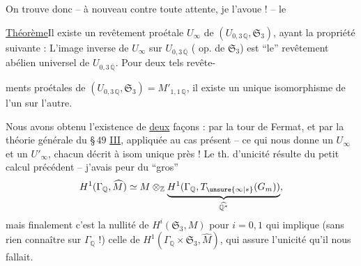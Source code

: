 On trouve donc -- à nouveau contre toute attente, je l'avoue ! -- le

\uline{Théorème}\quad Il existe un revêtement
proétale  $U_\infty$ de $(U_{0,3\,\mathbb Q},\mathfrak S_3)$, ayant la propriété suivante : L'image inverse  de $U_\infty$ sur $U_{0,3\,\overline{\mathbb Q}}$ ( op. de $\mathfrak S_3$) est ``le'' revêtement abélien universel de $U_{0,3\,\overline{\mathbb Q}}$. Pour deux tels revête-




ments proétales de $(U_{0,3\,\mathbb Q},\mathfrak S_3)=M'_{1,1\,\mathbb Q}$, il existe un unique isomorphisme de l'un sur l'autre.

Nous avons obtenu l'existence de \uline{deux} façons : par la tour de Fermat, et par la théorie générale du \S\,$49$ \uline{III}, appliquée au cas présent -- ce qui nous donne un $U_\infty$ et un $U'_\infty$, chacun décrit à isom unique près ! Le th. d'unicité résulte du petit calcul précédent -- j'avais peur du ``gros'' 
\[
H^1(\Gamma_{\mathbb Q},\widehat M)\simeq
M\otimes_{\mathbb Z}\underbrace{H^1(\Gamma_{\mathbb Q},T_{\unsure{\infty|*}}(G_m))}_{\widehat{\mathbb Q^{*}}},
\]
mais finalement c'est la nullité de $H^{i}(\mathfrak S_3,M)$ pour $i=0,1$ qui implique (sans rien connaître sur $\Gamma_{\mathbb Q}$ !) celle de $H^1(\Gamma_{\mathbb Q}\times\mathfrak S_3,\widehat M)$, qui assure l'unicité qu'il nous fallait.




